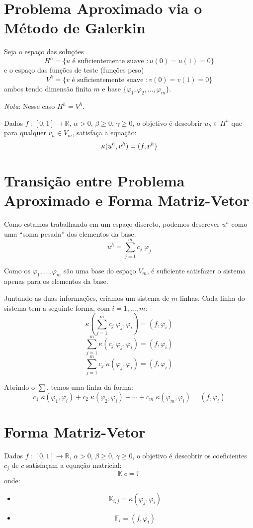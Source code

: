 \documentclass[a4paper]{article}
\newcommand{\typ}{\::\:}
\newcommand{\vphi}{\varphi}
\begin{document}
\section{Problema Aproximado via o Método de Galerkin}

Seja o espaço das soluções
\[
    H^h = \{
        u \text{ é suficientemente suave } : u(0) = u(1) = 0
    \}
\]
e o espaço das funções de teste (funções peso)
\[
    V^h = \{
        v \text{ é suficientemente suave } : v(0) = v(1) = 0
    \}
\]
ambos tendo dimensão finita \(m\)
e base \(\{ \vphi_1, \vphi_2, \dots, \vphi_m\}\).

\emph{Nota}: Nesse caso \(H^h = V^h\).

Dados
\(f \typ [0, 1] \to \mathbb{R}\),
\(\alpha > 0\),
\(\beta \ge 0\),
\(\gamma \ge 0\),
o objetivo é descobrir \(u_h \in H^h\)
que para qualquer \(v_h \in V_m\),
satisfaça a equação:
\[
    \kappa(u^h, v^h) = (f, v^h) \\
\]

\section{Transição entre Problema Aproximado e Forma Matriz-Vetor}

Como estamos trabalhando em um espaço discreto,
podemos descrever \(u^h\)
como uma ``soma pesada'' dos elementos da base:
\[
    u^h = \sum_{j=1}^m{ c_j \; \vphi_j }
\]


Como os \(\vphi_1, \dots, \vphi_m\)
são uma base do espaço \(V_m\),
é suficiente satisfazer o sistema
apenas para os elementos da base.

Juntando as duas informações,
criamos um sistema de \(m\) linhas.
Cada linha do sistema tem a seguinte forma,
com \(i = 1, \dots, m\):
\[
    \kappa(\sum_{j=1}^m{ c_j \; \vphi_j }, \vphi_i) = (f, \vphi_i)
\] \[
    \sum_{j=1}^m{ \kappa(c_j \; \vphi_j, \vphi_i) } = (f, \vphi_i)
\] \[
    \sum_{j=1}^m{ c_j \; \kappa(\vphi_j, \vphi_i) } = (f, \vphi_i)
\]

Abrindo o \(\sum\), temos uma linha da forma:
\[
    c_1 \; \kappa(\vphi_1, \vphi_i)
    + c_2 \; \kappa(\vphi_2, \vphi_i)
    + \cdots
    + c_m \; \kappa(\vphi_m, \vphi_i)
    = (f, \vphi_i)
\]

\section{Forma Matriz-Vetor}

Dados
\(f \typ [0, 1] \to \mathbb{R}\),
\(\alpha > 0\),
\(\beta \ge 0\),
\(\gamma \ge 0\),
o objetivo é descobrir os coeficientes \(c_j\)
de \(c\)
satisfaçam a equação matricial:
\[
    \mathbb{K} \; c = \mathbb{F}
\]
onde:
\begin{itemize}
\item \[
    \mathbb{K}_{i, j} = \kappa(\vphi_j, \vphi_i)
\]
\item \[
    \mathbb{F}_i = (f, \vphi_i)
\]
\end{itemize}
\end{document}
